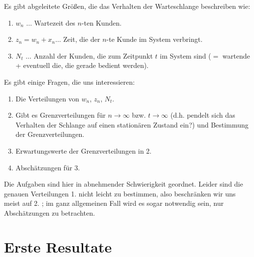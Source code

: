 Es gibt abgeleitete Größen, die das Verhalten der Warteschlange
beschreiben wie:
\begin{enumerate}
\item $w_{n}$ $\dots$ Wartezeit des $n$-ten Kunden.
\item $z_{n} = w_{n} + x_{n} \dots$ Zeit, die der $n$-te Kunde im System
verbringt.
\item $N_{t}$ $\dots$ Anzahl der Kunden, die zum Zeitpunkt $t$ im System
sind ($=$ wartende + eventuell die, die gerade bedient werden).
\end{enumerate}
Es gibt einige Fragen, die uns interessieren:
\begin{enumerate}
\item Die Verteilungen von $w_{n}$, $z_{n}$, $N_{t}$.
\item Gibt es Grenzverteilungen für $n \rightarrow \infty$ bzw. $t
\rightarrow \infty$ (d.h. pendelt sich das Verhalten der Schlange auf
einen stationären Zustand ein?) und Bestimmung der Grenzverteilungen.
\item Erwartungswerte der Grenzverteilungen in 2.
\item Abschätzungen für 3.
\end{enumerate}
Die Aufgaben sind hier in abnehmender Schwierigkeit geordnet. Leider sind
die genauen Verteilungen 1. nicht leicht zu bestimmen, also beschränken
wir uns meist auf 2. ; im ganz allgemeinen Fall wird es sogar notwendig
sein, nur Abschätzungen zu betrachten.
\chapter{Erste Resultate}
